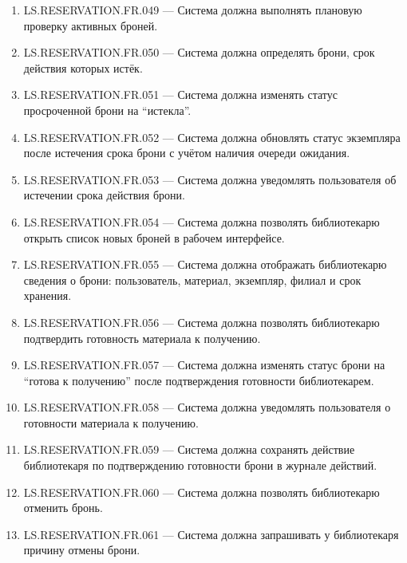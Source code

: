 \documentclass[12pt,a4paper]{article}
\begin{document}
\begin{enumerate}
		\item LS.RESERVATION.FR.049 --- Система должна выполнять плановую проверку
		активных броней.
		
		\item LS.RESERVATION.FR.050 --- Система должна определять брони, срок действия
		которых истёк.
		
		\item LS.RESERVATION.FR.051 --- Система должна изменять статус просроченной
		брони на ``истекла''.
		
		\item LS.RESERVATION.FR.052 --- Система должна обновлять статус экземпляра
		после истечения срока брони с учётом наличия очереди ожидания.
		
		\item LS.RESERVATION.FR.053 --- Система должна уведомлять пользователя об
		истечении срока действия брони.
		
		\item LS.RESERVATION.FR.054 --- Система должна позволять библиотекарю открыть
		список новых броней в рабочем интерфейсе.
		
		\item LS.RESERVATION.FR.055 --- Система должна отображать библиотекарю сведения
		о брони: пользователь, материал, экземпляр, филиал и срок хранения.
		
		\item LS.RESERVATION.FR.056 --- Система должна позволять библиотекарю
		подтвердить готовность материала к получению.
		
		\item LS.RESERVATION.FR.057 --- Система должна изменять статус брони на
		``готова к получению'' после подтверждения готовности библиотекарем.
		
		\item LS.RESERVATION.FR.058 --- Система должна уведомлять пользователя о
		готовности материала к получению.
		
		\item LS.RESERVATION.FR.059 --- Система должна сохранять действие библиотекаря
		по подтверждению готовности брони в журнале действий.
		
		\item LS.RESERVATION.FR.060 --- Система должна позволять библиотекарю отменить
		бронь.
		
		\item LS.RESERVATION.FR.061 --- Система должна запрашивать у библиотекаря
		причину отмены брони.
		

\end{enumerate}
\end{document}
